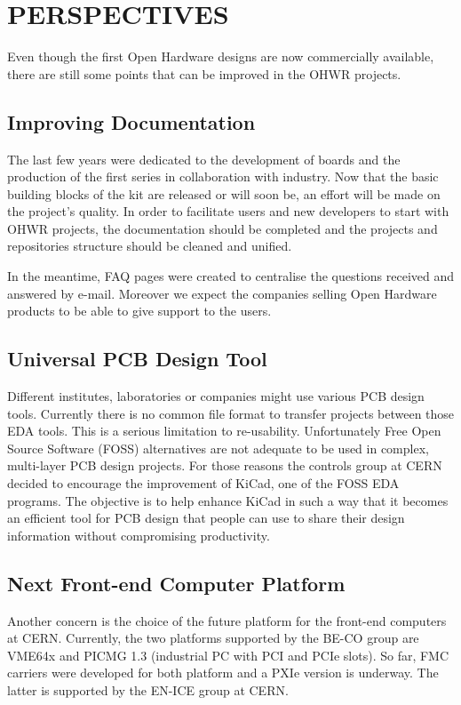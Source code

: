 \documentclass{JAC2003}
\begin{document}
\section{PERSPECTIVES}
Even though the first Open Hardware designs are now commercially available, there are still some points that can be improved in the OHWR projects.

\subsection{Improving Documentation}
The last few years were dedicated to the development of boards and the production of the first series in collaboration with industry.
Now that the basic building blocks of the kit are released or will soon be, an effort will be made on the project's quality.
In order to facilitate users and new developers to start with OHWR projects, the documentation should be completed and the projects and repositories structure should be cleaned and unified.

In the meantime, FAQ pages were created to centralise the questions received and answered by e-mail.
Moreover we expect the companies selling Open Hardware products to be able to give support to the users.

\subsection{Universal PCB Design Tool}
Different institutes, laboratories or companies might use various PCB design tools.
Currently there is no common file format to transfer projects between those EDA tools.
This is a serious limitation to re-usability.
Unfortunately Free Open Source Software (FOSS) alternatives are not adequate to be used in complex, multi-layer PCB design projects.
For those reasons the controls group at CERN decided to encourage the improvement of KiCad, one of the FOSS EDA programs.
The objective is to help enhance KiCad in such a way that it becomes an efficient tool for PCB design that people can use to share their design information without compromising productivity.

\subsection{Next Front-end Computer Platform}
Another concern is the choice of the future platform for the front-end computers at CERN.
Currently, the two platforms supported by the BE-CO group are VME64x and PICMG 1.3 (industrial PC with PCI and PCIe slots).
So far, FMC carriers were developed for both platform and a PXIe version is underway.
The latter is supported by the EN-ICE group at CERN.
\end{document}

